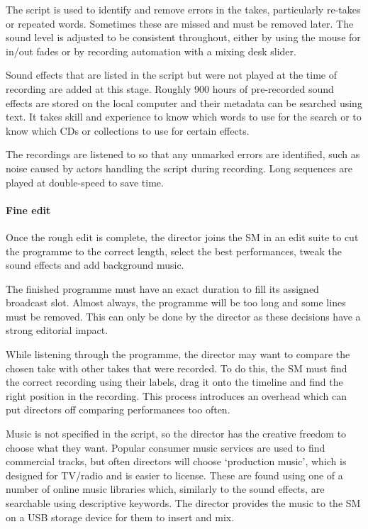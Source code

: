 The script is used to identify and remove errors in the takes, particularly re-takes or repeated words. Sometimes these
are missed and must be removed later. The sound level is adjusted to be consistent throughout, either by using the
mouse for in/out fades or by recording automation with a mixing desk slider.

Sound effects that are listed in the script but were not played at the time of recording are added at this stage.
Roughly 900 hours of pre-recorded sound effects are stored on the local computer and their metadata can be searched
using text. It takes skill and experience to know which words to use for the search or to know which CDs or collections
to use for certain effects.

The recordings are listened to so that any unmarked errors are identified, such as noise caused by actors handling the
script during recording. Long sequences are played at double-speed to save time.

\paragraph{Fine edit}\label{sec:drama-fine}
Once the rough edit is complete, the director joins the SM in an edit suite to cut the programme to the correct length,
select the best performances, tweak the sound effects and add background music.

The finished programme must have an exact duration to fill its assigned broadcast slot. Almost always, the programme
will be too long and some lines must be removed. This can only be done by the director as these decisions have a strong
editorial impact.

While listening through the programme, the director may want to compare the chosen take with other takes that were
recorded. To do this, the SM must find the correct recording using their labels, drag it onto the timeline and find the
right position in the recording. This process introduces an overhead which can put directors off comparing performances
too often.

Music is not specified in the script, so the director has the creative freedom to choose what they want. Popular
consumer music services are used to find commercial tracks, but often directors will choose `production music', which
is designed for TV/radio and is easier to license. These are found using one of a number of online music libraries
which, similarly to the sound effects, are searchable using descriptive keywords. The director provides the music to
the SM on a USB storage device for them to insert and mix.


